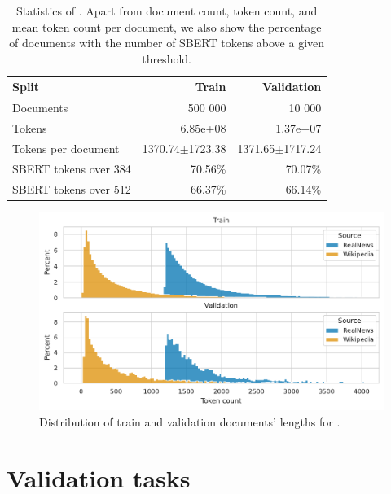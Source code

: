 \begin{table}
  \centering
  \footnotesize

  \begin{tabular}{lrr}
    \toprule
      Split & Train & Validation \\
    \midrule
      Documents & 500 000 & 10 000 \\
      Tokens & 6.85e+08 & 1.37e+07 \\
      Tokens per document & 1370.74$\pm$1723.38 & 1371.65$\pm$1717.24 \\
      SBERT tokens over 384 & 70.56\% & 70.07\% \\
      SBERT tokens over 512 & 66.37\% & 66.14\% \\
    \bottomrule
  \end{tabular}

  \caption{Statistics of . Apart from document count, token
  count, and mean token count per document, we also show the percentage of documents
  with the number of SBERT tokens above a given threshold.}

  \label{table:val_data_stats}

\end{table}

\begin{figure}

  \includegraphics[width=\textwidth]{./img/val_data_dist.pdf}

  \caption{Distribution of train and validation documents' lengths for
  .}

  \label{fig:val_data_dist}

\end{figure}

\section{Validation tasks}\label{section:validation_tasks}

